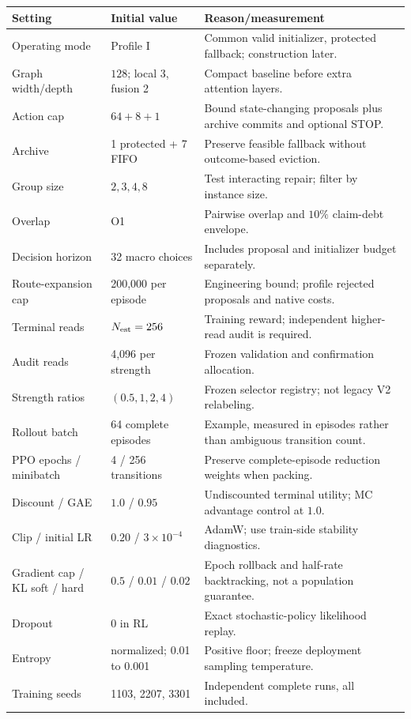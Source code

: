 {\small\begin{longtable}{@{}P{.30\textwidth}P{.20\textwidth}P{.43\textwidth}@{}}
\toprule
Setting & Initial value & Reason/measurement\\\midrule\endhead
Operating mode & Profile I & Common valid initializer, protected fallback; construction later.\\
Graph width/depth & $128$; local 3, fusion 2 & Compact baseline before extra attention layers.\\
Action cap & $64+8+1$ & Bound state-changing proposals plus archive commits and optional STOP.\\
Archive & 1 protected + 7 FIFO & Preserve feasible fallback without outcome-based eviction.\\
Group size & $2,3,4,8$ & Test interacting repair; filter by instance size.\\
Overlap & O1 & Pairwise overlap and $10\%$ claim-debt envelope.\\
Decision horizon & 32 macro choices & Includes proposal and initializer budget separately.\\
Route-expansion cap & 200,000 per episode & Engineering bound; profile rejected proposals and native costs.\\
Terminal reads & $N_{\rm est}=256$ & Training reward; independent higher-read audit is required.\\
Audit reads & 4,096 per strength & Frozen validation and confirmation allocation.\\
Strength ratios & $(0.5,1,2,4)$ & Frozen selector registry; not legacy V2 relabeling.\\
Rollout batch & 64 complete episodes & Example, measured in episodes rather than ambiguous transition count.\\
PPO epochs / minibatch & 4 / 256 transitions & Preserve complete-episode reduction weights when packing.\\
Discount / GAE & $1.0$ / $0.95$ & Undiscounted terminal utility; MC advantage control at $1.0$.\\
Clip / initial LR & $0.20$ / $3\times10^{-4}$ & AdamW; use train-side stability diagnostics.\\
Gradient cap / KL soft / hard & $0.5$ / $0.01$ / $0.02$ & Epoch rollback and half-rate backtracking, not a population guarantee.\\
Dropout & 0 in RL & Exact stochastic-policy likelihood replay.\\
Entropy & normalized; 0.01 to 0.001 & Positive floor; freeze deployment sampling temperature.\\
Training seeds & 1103, 2207, 3301 & Independent complete runs, all included.\\
\bottomrule\end{longtable}}

